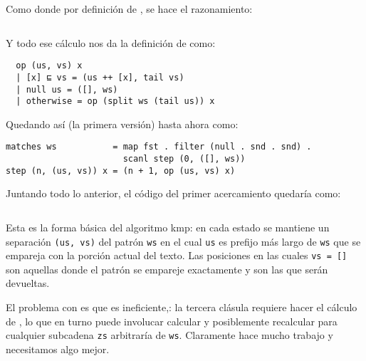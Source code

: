Como  donde por definición de ,
se hace el razonamiento:

\inputminted{haskell}{definiciones/kmp/1-op-raz-eq.hs}

Y todo ese cálculo nos da la definición de  como:

\begin{verbatim}
  op (us, vs) x
  | [x] ⊑ vs = (us ++ [x], tail vs)
  | null us = ([], ws)
  | otherwise = op (split ws (tail us)) x
\end{verbatim}

Quedando así (la primera versión) hasta ahora como:

\begin{verbatim}
matches ws           = map fst . filter (null . snd . snd) .
                       scanl step (0, ([], ws))
step (n, (us, vs)) x = (n + 1, op (us, vs) x)
\end{verbatim}



Juntando todo lo anterior, el código del primer acercamiento quedaría como:

\inputminted{haskell}{codigo/haskell/1-first-steps.hs}


Esta es la forma básica del algoritmo kmp: en cada estado se mantiene un separación \texttt{(us, vs)}
del patrón \texttt{ws} en el cual \texttt{us} es prefijo más largo de \texttt{ws} que se empareja
con la porción actual del texto. Las posiciones en las cuales \texttt{vs = []} son aquellas donde el patrón
se empareje exactamente y son las que serán devueltas.

El problema con  es que es ineficiente,: la tercera clásula requiere hacer el cálculo de
, lo que en turno puede involucar calcular y posiblemente recalcular
 para cualquier subcadena \texttt{zs} arbitraría de \texttt{ws}. Claramente
 hace mucho trabajo y necesitamos algo mejor. 

